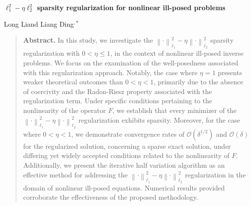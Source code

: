 \documentclass[a4paper,12pt]{article}
\numberwithin{equation}{section}
\begin{document}
\begin{center}
\Large\bf $\ell_{1}^{2}-\eta\ell_{2}^{2}$ sparsity regularization for nonlinear ill-posed problems
\end{center}

\begin{center}
Long Li\footnotemark[1] \quad and \quad Liang Ding\footnotemark[2]$^{,*}$


\renewcommand{\thefootnote}{\fnsymbol{footnote}}
\renewcommand{\thefootnote}{\arabic{footnote}}
\end{center}

\medskip
\begin{quote}
{\bf Abstract.} In this study, we investigate the $\left\|\cdot\right\|_{\ell_{1}}^{2}-\eta\left\|\cdot\right\|_{\ell_{2}}^{2}$ sparsity regularization with $0< \eta\leq 1$, in the context of nonlinear ill-posed inverse problems. We focus on the examination of the well-posedness associated with this regularization approach. Notably, the case where $\eta=1$ presents weaker theoretical outcomes than $0< \eta<1$, primarily due to the absence of coercivity and the Radon-Riesz property associated with the regularization term. Under specific conditions pertaining to the nonlinearity of the operator $F$, we establish that every minimizer of the $\left\|\cdot\right\|_{\ell_{1}}^{2}-\eta\left\|\cdot\right\|_{\ell_{2}}^{2}$ regularization exhibits sparsity. Moreover, for the case where $0<\eta<1$, we demonstrate convergence rates of $\mathcal{O}\left(\delta^{1/2}\right)$ and $\mathcal{O}\left(\delta\right)$ for the regularized solution, concerning a sparse exact solution, under differing yet widely accepted conditions related to the nonlinearity of $F$. Additionally, we present the iterative half variation algorithm as an effective method for addressing the $\left\|\cdot\right\|_{\ell_{1}}^{2}-\eta\left\|\cdot\right\|_{\ell_{2}}^{2}$ regularization in the domain of nonlinear ill-posed equations. Numerical results provided corroborate the effectiveness of the proposed methodology.

\end{quote}
\end{document}
